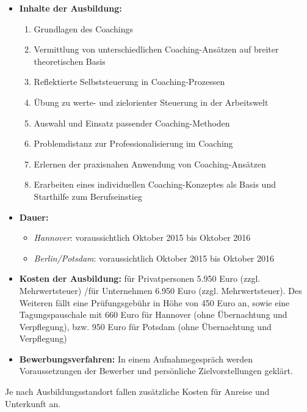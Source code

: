 \documentclass[11pt,a4paper]{article}
\begin{document}
	\begin{itemize}
	\item \textbf{Inhalte der Ausbildung:}

			\begin{enumerate}
			\item Grundlagen des Coachings
			\item Vermittlung von unterschiedlichen Coaching-Ansätzen auf breiter theoretischen Basis
			\item Reflektierte Selbststeuerung in Coaching-Prozessen
			\item Übung zu werte- und zielorienter Steuerung in der Arbeitswelt
			\item Auswahl und Einsatz passender Coaching-Methoden
			\item Problemdistanz zur Professionalisierung im Coaching 
			\item Erlernen der praxisnahen Anwendung von Coaching-Ansätzen
			\item Erarbeiten eines individuellen Coaching-Konzeptes als Basis und Starthilfe zum Berufseinstieg
			\end{enumerate}

	\item \textbf{Dauer:}

		\begin{itemize} 
		\item \textsl{Hannover}: voraussichtlich Oktober 2015 bis Oktober 2016
		\item \textsl{Berlin/Potsdam}: voraussichtlich Oktober 2015 bis Oktober 2016
		\end{itemize}

	\item \textbf{Kosten der Ausbildung:} für Privatpersonen 5.950 Euro (zzgl. Mehrwertsteuer) /für Unternehmen 6.950 Euro (zzgl. Mehrwertsteuer). Des Weiteren fällt eine Prüfungsgebühr in Höhe von 450 Euro an, sowie eine Tagungspauschale mit 660 Euro für Hannover (ohne Übernachtung und Verpflegung), bzw. 950 Euro für Potsdam (ohne Übernachtung und Verpflegung)

	\item \textbf{Bewerbungsverfahren:} In einem Aufnahmegespräch werden Voraussetzungen der Bewerber und persönliche Zielvorstellungen geklärt.


	\end{itemize}

Je nach Ausbildungsstandort fallen zusätzliche Kosten für Anreise und Unterkunft an.

\newpage
\end{document}

